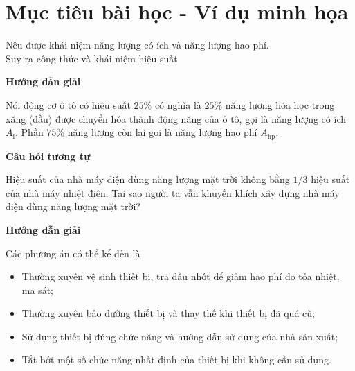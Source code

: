 \section{Mục tiêu bài học - Ví dụ minh họa}
\begin{dang}{Nêu được khái niệm năng lượng có ích và năng lượng hao phí.\\ Suy ra công thức và khái niệm hiệu suất}
	
	{\begin{center}
			\textbf{Hướng dẫn giải}
		\end{center}
		
		Nói động cơ ô tô có hiệu suất $25\%$ có nghĩa là $25\%$ năng lượng hóa học trong xăng (dầu) được chuyển hóa thành động năng của ô tô, gọi là năng lượng có ích $A_\text{i}$. Phần $75\%$ năng lượng còn lại gọi là năng lượng hao phí $A_\text{hp}$.
		
		\begin{center}
			\textbf{Câu hỏi tương tự}
		\end{center}
		
		Hiệu suất của nhà máy điện dùng năng lượng mặt trời không bằng $1/3 $ hiệu suất của nhà máy nhiệt điện. Tại sao người ta vẫn khuyến khích xây dựng nhà máy điện dùng năng lượng mặt trời?
		
	}
	{\begin{center}
			\textbf{Hướng dẫn giải}
		\end{center}
		
		Các phương án có thể kể đến là
		\begin{itemize}
			\item Thường xuyên vệ sinh thiết bị, tra dầu nhớt để giảm hao phí do tỏa nhiệt, ma sát;
			\item Thường xuyên bảo dưỡng thiết bị và thay thế khi thiết bị đã quá cũ;
			\item Sử dụng thiết bị đúng chức năng và hướng dẫn sử dụng của nhà sản xuất;
			\item Tắt bớt một số chức năng nhất định của thiết bị khi không cần sử dụng.
		\end{itemize}
	}
\end{dang}

